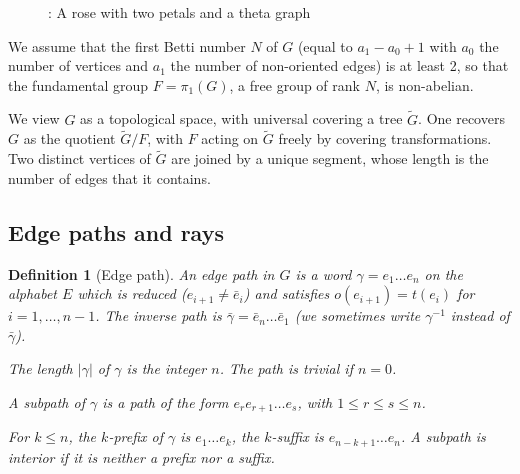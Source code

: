 \documentclass[11pt]{amsart}
\newtheorem{dfn}[thm]{Definition}
\theoremstyle{remark}
\newcommand{\m} {^{-1}}
\begin{document}
 \begin{figure}
\begin{center}


\end{center}


\caption{\label{theta graph} : A rose with two petals and a theta graph }    

\end{figure}


   
   
 We assume that the first Betti number $N$ of $G$ (equal to $a_1-a_0+1$ with $a_0$ the number of vertices and $a_1$ the number of non-oriented edges)  is at least 2, so that the fundamental group $ F=\pi_1(G)$, a  free group of rank $N$, is non-abelian.
 
 We view $G$ as a topological space, with universal covering a tree $\tilde G$. One recovers $G$ as the quotient $\tilde G/F$, with $F$   acting  on $\tilde G$ freely by covering transformations. Two distinct vertices of $\tilde G$ are joined by a unique segment, whose length is the number of edges that it contains.  
 
 \subsection{Edge paths and rays}
 \begin{dfn} [Edge path] An edge path in $G$ is a word $\gamma=e_1\dots e_n$ on the alphabet $E$ which is reduced ($e_{i+1}\ne \bar e_i$) and satisfies $o(e_{i+1}) =t(e_i)$ for $i=1,\dots,n-1$.  The inverse path is $\bar\gamma=\bar e_n\dots \bar e_1$ (we sometimes write $\gamma\m$ instead of $\bar\gamma$). 
 
 The length $ |\gamma  | $ of $\gamma$ is the integer $n$. The path is trivial if $n=0$.
 
 A subpath of $\gamma$ is a path of the form $e_re_{r+1} \dots e_s$, with $1\le r\le s\le n$.
 
 For $k\le n$, the $k$-prefix of $\gamma$ is $e_1\dots e_k$, the $k$-suffix is $e_{n-k+1}\dots e_n$. A subpath is interior if it is neither a prefix nor a suffix.
  \end{dfn}
  
\end{document}
